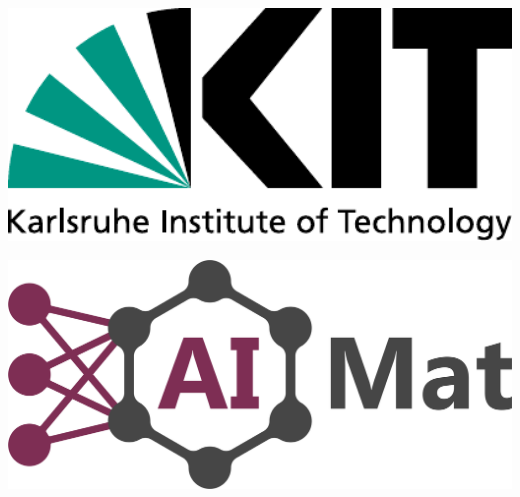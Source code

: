
\FrontMatter

\newcommand{\diameter}{20}
\newcommand{\xone}{-15}
\newcommand{\xtwo}{160}
\newcommand{\yone}{15}
\newcommand{\ytwo}{-253}


\begin{titlepage}

	\thispagestyle{alim}

	\noindent

	\noindent\begin{minipage}{0.25\textwidth}%
		\includegraphics[width=1\textwidth]{include/kitlogo.pdf}
	\end{minipage}
	\hfill
	\begin{minipage}{0.25\textwidth}\raggedleft
		\includegraphics[width=1\textwidth]{include/AiMat_logo_purple.png}
	\end{minipage}

    \centering

	\vspace*{4.0cm}


\end{titlepage}
